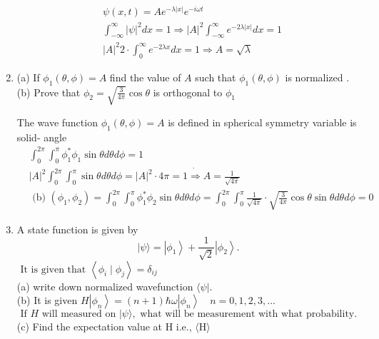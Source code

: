 \begin{enumerate}
\begin{answer}
	\begin{align*}
		&\psi(x, t)=A e^{-\lambda|x|} e^{-i \omega t}\\
		&\int_{-\infty}^{\infty}|\psi|^{2} d x=1 \Rightarrow|A|^{2} \int_{-\infty}^{\infty} e^{-2 \lambda|x|} d x=1 \\
		&|A|^{2} 2 \cdot \int_{0}^{\infty} e^{-2 \lambda x} d x=1 \Rightarrow A=\sqrt{\lambda}
	\end{align*}
\end{answer}
	\item (a) If $\phi_{1}(\theta, \phi)=A$ find the value of $A$ such that $\phi_{1}(\theta, \phi)$ is normalized .\\
	(b) Prove that $\phi_{2}=\sqrt{\frac{3}{4 \pi}} \cos \theta$ is orthogonal to $\phi_{1}$
\begin{answer}
 The wave function $\phi_{1}(\theta, \phi)=A$ is defined in spherical symmetry variable is solid- angle\\
 \begin{align*}
 &\int_{0}^{2 \pi } \int_{0}^{\pi} \phi_{1}^* \phi_{1} \sin \theta d \theta d \phi=1\\
 &|A|^{2} \int_{0}^{2 \pi} \int_{0}^{\pi} \sin \theta d \theta d \phi=|A|^{2} \cdot 4 \pi=1 \dot{\Rightarrow} A=\frac{1}{\sqrt{4 \pi}}\\
  &\text { (b) }\left(\phi_{1}, \phi_{2}\right)=\int_{0}^{2 \pi} \int_{0}^{\pi} \phi_{1}^{*} \phi_{2} \sin \theta d \theta d \phi=\int_{0}^{2 \pi} \int_{0}^{\pi} \frac{1}{\sqrt{4 \pi}} \cdot \sqrt{\frac{3}{4 \pi}} \cos \theta \sin \theta d \theta d \phi=0
 \end{align*}
\end{answer}
	\item A state function is given by
	$$
	|\psi\rangle=\left|\phi_{1}\right\rangle+\frac{1}{\sqrt{2}}\left|\phi_{2}\right\rangle .
	$$
	$\text { It is given that }\left\langle\phi_{i} \mid \phi_{j}\right\rangle=\delta_{i j}$\\
	(a) write down normalized wavefunction $\langle\psi|$.\\
	(b) It is given $H\left|\phi_{n}\right\rangle=(n+1) \hbar \omega\left|\phi_{n}\right\rangle \quad n=0,1,2,3, \ldots$\\
	$\text { If } H \text { will measured on }|\psi\rangle, \text { what will be measurement with what probability. }$\\
	(c) Find the expectation value at $\mathrm{H}$ i.e., $\langle\mathrm{H}\rangle$\\

\end{enumerate}
